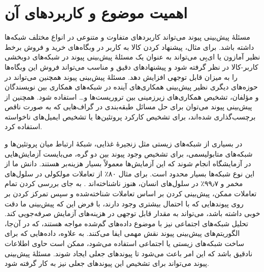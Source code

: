 \section{اهمیت موضوع و کاربردهای آن}

مسئلهٔ پیش‌بینی پیوند می‌تواند کاربردهای متفاوت و متنوعی در انواع مختلف شبکه‌ها داشته باشد. برای مثال، پیشنهاد کردن کالا به کاربر در وبگاه‌های خرید و فروش برخط نظیر آمازون یا ای‌بِی می‌تواند به عنوان یک مسئلهٔ پیش‌بینی پیوند در شبکه‌های دوبخشی کاربر-کالا در نظر گرفته شود و پیشنهادهای دقیق و مناسب می‌تواند فروش این وبگاه‌ها را به میزان قابل توجهی افزایش دهد. مسئلهٔ پیش‌بینی پیوند همچنین می‌تواند در حوزه‌های دیگری نظیر پیش‌بینی همکاری‌های آینده در شبکه‌های همکاری بین نویسندگان و مؤلفان، تشخیص همکاری‌های زیرزمینی بین تروریست‌ها و… استفاده شود. همچنین از پیش‌بینی پیوند می‌توان برای حل مسائل طبقه‌بندی در گراف‌هایی که به صورت ناقص برچسب‌گذاری شده‌اند، برای تشخیص کارکرد پروتئین‌ها یا تشخیص ایمیل‌های ناخواسته استفاده کرد.

در بسیاری از شبکه‌های زیستی مثل زنجیرهٔ غذایی، شبکهٔ ارتباط میان پروتئین‌ها و شبکه‌های متابولیسمی، برای تشخیص وجود پیوند بین دو گره، می‌بایست آزمایش‌هایی در آزمایشگاه انجام شوند که این آزمایش‌ها معمولاً بسیار هزینه‌بر هستند. دانش ما از این نوع شبکه‌ها بسیار محدود است. برای مثال ۸۰٪ از تعاملات مولکولی در سلول‌های مخمر و ۹۹٫۷٪ در سلول‌های انسان، هنوز ناشناخته‌اند \cite{stumpf2008estimating} \cite{amaral2008truer}. به جای بررسی کردن تمام تعاملات ممکن، پیش‌بینی کردن بر اساس تعاملات شناخته‌شده و سپس تمرکز کردن بر روی پیوند‌هایی که با احتمال بیشتری وجود دارند، با فرض این که پیش‌بینی ما دقت خوبی داشته باشد، می‌تواند به مقدار قابل توجهی در هزینه‌های آزمایش صرفه‌جویی کند. تحلیل شبکه‌های اجتماعی نیز با موضوع داده‌های گم‌شده مواجه هستند\cite{neal2008kracking}، که در آن‌جا، الگوریتم‌های پیش‌بینی پیوند نقش مهمی ایفا می‌کنند. به علاوه، داده‌هایی که برای ساخت شبکه‌های زیستی یا اجتماعی استفاده می‌شود، ممکن است حاوی اطلاعات نادقیق باشد که این امر باعث می‌شود تا پیوند‌های جعلی ایجاد شوند\cite{von2002comparative}. مسئلهٔ پیش‌بینی پیوند می‌تواند برای تشخیص این پیوندهای جعلی نیز به کار گرفته شود\cite{guimera2009missing}.

